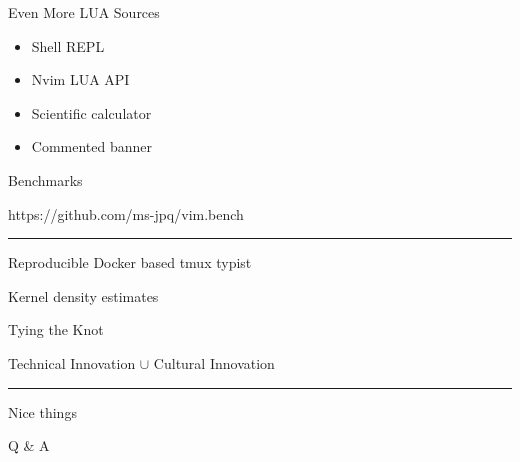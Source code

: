 \documentclass{beamer}
\begin{document}
\begin{frame}{Even More LUA Sources}

	\begin{itemize}

		\item Shell REPL

		\item Nvim LUA API

		\item Scientific calculator

		\item Commented banner

	\end{itemize}

\end{frame}


\begin{frame}{Benchmarks}

	https://github.com/ms-jpq/vim.bench

	\rule{\textwidth}{0.1em}

	Reproducible Docker based tmux typist

	Kernel density estimates

\end{frame}


\begin{frame}{Tying the Knot}

	\begin{centering}

		{\Large Technical Innovation $\cup$ Cultural Innovation}

		\rule{\textwidth}{0.1em}

		{\LARGE Nice things}

	\end{centering}

\end{frame}


\begin{frame}[standout]

	Q \& A

\end{frame}
\end{document}
